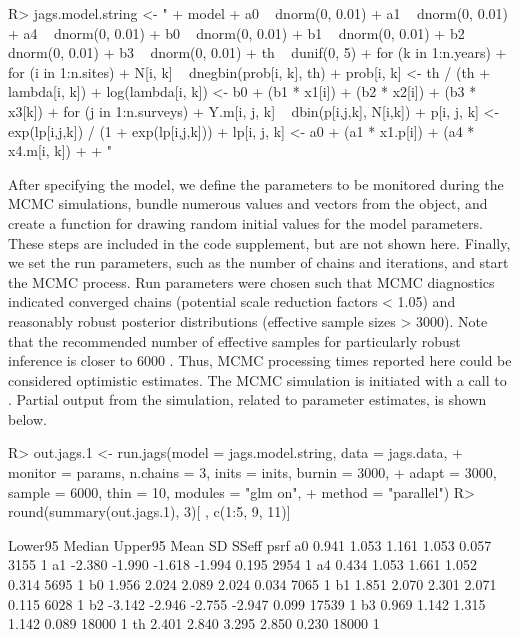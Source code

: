 \documentclass[codesnippet]{jss}
\begin{document}
\begin{CodeInput}
R> jags.model.string <- "
+    model {
+      a0 ~ dnorm(0, 0.01)
+      a1 ~ dnorm(0, 0.01)
+      a4 ~ dnorm(0, 0.01)
+      b0 ~ dnorm(0, 0.01)
+      b1 ~ dnorm(0, 0.01)
+      b2 ~ dnorm(0, 0.01)
+      b3 ~ dnorm(0, 0.01)
+      th ~ dunif(0, 5)
+    for (k in 1:n.years){
+      for (i in 1:n.sites){
+        N[i, k] ~ dnegbin(prob[i, k], th)
+        prob[i, k] <- th / (th + lambda[i, k])
+        log(lambda[i, k]) <- b0 + (b1 * x1[i]) + (b2 * x2[i]) + (b3 * x3[k])
+        for (j in 1:n.surveys){
+          Y.m[i, j, k] ~ dbin(p[i,j,k], N[i,k])
+          p[i, j, k] <- exp(lp[i,j,k]) / (1 + exp(lp[i,j,k]))
+          lp[i, j, k] <- a0 + (a1 * x1.p[i]) + (a4 * x4.m[i, k])
+    }}}}
+  "
\end{CodeInput}

After specifying the  model, we define the parameters to be monitored during the MCMC simulations, bundle numerous values and vectors from the  object, and create a function for drawing random initial values for the model parameters. These steps are included in the code supplement, but are not shown here. Finally, we set the run parameters, such as the number of chains and iterations, and start the MCMC process. Run parameters were chosen such that MCMC diagnostics indicated converged chains (potential scale reduction factors < 1.05) and reasonably robust posterior distributions (effective sample sizes > 3000). Note that the recommended number of effective samples for particularly robust inference is closer to 6000 \citep{Gong_Flegal_2016}. Thus, MCMC processing times reported here could be considered optimistic estimates. The MCMC simulation is initiated with a call to . Partial output from the simulation, related to parameter estimates, is shown below.

\begin{CodeInput}
R> out.jags.1 <- run.jags(model = jags.model.string, data = jags.data, 
+    monitor = params, n.chains = 3, inits = inits, burnin = 3000, 
+    adapt = 3000, sample = 6000, thin = 10, modules = "glm on", 
+    method = "parallel")
R> round(summary(out.jags.1), 3)[ , c(1:5, 9, 11)]
\end{CodeInput}
\begin{CodeOutput}
            Lower95 Median Upper95   Mean    SD SSeff psrf
a0            0.941  1.053   1.161  1.053 0.057  3155    1
a1           -2.380 -1.990  -1.618 -1.994 0.195  2954    1
a4            0.434  1.053   1.661  1.052 0.314  5695    1
b0            1.956  2.024   2.089  2.024 0.034  7065    1
b1            1.851  2.070   2.301  2.071 0.115  6028    1
b2           -3.142 -2.946  -2.755 -2.947 0.099 17539    1
b3            0.969  1.142   1.315  1.142 0.089 18000    1
th            2.401  2.840   3.295  2.850 0.230 18000    1
\end{CodeOutput}
\end{document}
